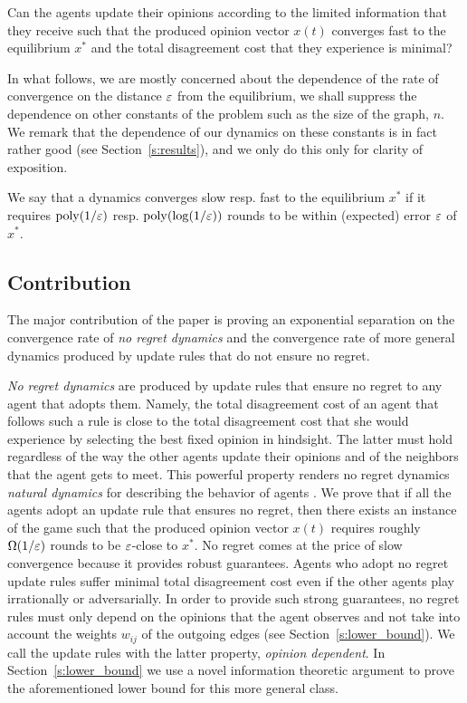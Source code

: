 \begin{question}\label{q:motivation2}
  Can the agents update their opinions according to the limited information
  that they receive such that the produced opinion vector $x(t)$ converges fast
  to the equilibrium $x^*$ and the total disagreement cost that they experience
  is minimal?
\end{question}

In what follows, we are mostly concerned about the dependence of
the rate of convergence on the distance $\varepsilon$ from the equilibrium, we shall
suppress the dependence on other constants of the problem such as the size of
the graph, $n$.  We remark that the dependence of our dynamics on these
constants is in fact rather good (see Section~\ref{s:results}), and we only do
this only for clarity of exposition.

\begin{definition}[Informal]\label{d:convergence_rate}
  We say that a dynamics converges slow resp. fast to the equilibrium $x^*$ if
  it requires $\mathrm{poly}(1/\varepsilon)$ resp. $\mathrm{poly}(\log(1/\varepsilon))$ rounds to
  be within (expected) error $\varepsilon$ of $x^*$.
\end{definition}

\subsection{Contribution}
The major contribution of the paper is proving an exponential separation on
the convergence rate of \emph{no regret dynamics} and the convergence rate of
more general dynamics produced by update rules that do not ensure no regret.

\emph{No regret dynamics} are produced by update rules that
ensure no regret to any agent that adopts them.
Namely, the total disagreement cost of an agent that follows such a
rule is close to the total disagreement cost that she would experience by
selecting the best fixed opinion in hindsight. The latter must hold
regardless of the way the other agents update their opinions
and of the neighbors that the agent gets to meet.
This powerful property renders no regret dynamics \emph{natural dynamics}
for describing the behavior of agents \cite{CL03,EMN09,KPT11,SALS15}.
We prove that if all the agents adopt an update rule that ensures no regret,
then there exists an instance of the game such that the produced opinion
vector $x(t)$ requires roughly $\Omega(1/\varepsilon)$ rounds to
be $\varepsilon$-close to $x^*$. No regret comes at the price of slow convergence
because it provides robust guarantees.
Agents who adopt no regret update rules suffer minimal total disagreement
cost even if the other agents play irrationally or adversarially.
In order to provide such strong guarantees, no regret rules must only depend on
the opinions that the agent observes and not take into account
the weights $w_{ij}$ of the outgoing edges (see Section~\ref{s:lower_bound}).
We call the update rules with the latter property, \emph{opinion dependent}.
In Section~\ref{s:lower_bound} we use a novel information theoretic argument
to prove the aforementioned lower bound for this more general class.

